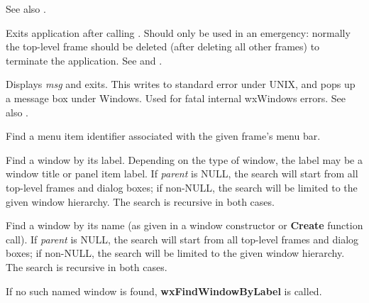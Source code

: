 See also .

\label{wxexit}


Exits application after calling .
Should only be used in an emergency: normally the top-level frame
should be deleted (after deleting all other frames) to terminate the
application. See  and .

\label{wxfatalerror}


Displays {\it msg} and exits. This writes to standard error under UNIX,
and pops up a message box under Windows. Used for fatal internal
wxWindows errors. See also .



Find a menu item identifier associated with the given frame's menu bar.



Find a window by its label. Depending on the type of window, the label may be a window title
or panel item label. If {\it parent} is NULL, the search will start from all top-level
frames and dialog boxes; if non-NULL, the search will be limited to the given window hierarchy.
The search is recursive in both cases.

\label{wxfindwindowbyname}


Find a window by its name (as given in a window constructor or {\bf Create} function call).
If {\it parent} is NULL, the search will start from all top-level
frames and dialog boxes; if non-NULL, the search will be limited to the given window hierarchy.
The search is recursive in both cases.

If no such named window is found, {\bf wxFindWindowByLabel} is called.

